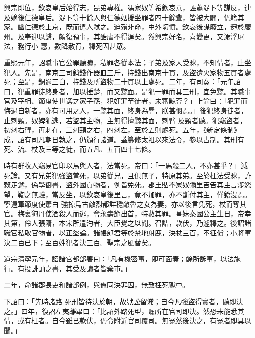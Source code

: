 
\begin{pinyinscope}

 興宗即位，欽哀皇后始得志，昆弟專權。馮家奴等希欽哀意，誣蕭浞卜等謀反，連及嫡後仁德皇后。浞卜等十餘人與仁德姻援坐罪者四十餘輩，皆被大闢，仍籍其家。幽仁德於上京，既而遣人弒之。迫殞非命，中外切憤。欽哀後謀廢立，遷於慶州。及奉迎以歸，頗復預事，其酷虐不得逞矣。然興宗好名，喜變更，又溺浮屠法，務行小
 惠，數降赦宥，釋死囚甚眾。



 重熙元年，詔職事官公罪聽贖，私罪各從本法；子弟及家人受賕，不知情者，止坐犯人。先是，南京三司銷錢作器皿三斤，持錢出南京十貫，及盜遺火家物五貫者處死；至是，銅逾三白，持錢及所盜物二十貫以上處死。二年，有司奏：「元年詔曰，犯重罪徒終身者，加以捶楚，而又黥面。是犯一罪而具三刑，宜免黥。其職事官及宰相、節度使世選之家子孫，犯奸罪至徒者，未審黥否？」上諭曰：「犯罪而悔過自新者，亦有可用之人，一黥其面，終身為辱，朕甚憫焉。」後犯終身徒者，止刺頸。奴婢犯逃，若盜其主物，主無得擅黥其面，刺臂
 及頸者聽。犯竊盜者，初刺右臂，再刺在，三刺頸之右，四刺左，至於五則處死。五年，《新定條制》成，詔有司凡朝日執之，仍頒行諸道。蓋纂修太祖以來法令，參以古制。其刑有死、流、杖及三等之徒，而五凡、五百四十七條。



 時有群牧人竊易官印以馬與人者，法當死，帝曰：「一馬殺二人，不亦甚乎？」減死論。又有兄弟犯強盜當死，以弟從兄，且俱無子，特原其弟。至於枉法受賕，詐敕走遞，偽學御書，盜外國貢物者，例皆免死。郡王貼不家奴彌里吉告其主言涉怨望，鞫之無驗，當反坐，以欽哀皇後里言，竟不加罪，亦不斷付其主，僅籍沒焉。寧遠軍節度使蕭白
 強掠烏古敵烈都詳穩敵魯之女為妻，亦以後言免死，杖而奪其官。梅裏狗丹使酒殺人而逃，會永壽節出首，特赦其罪。皇妹秦國公主生日，帝幸其第，伶人張隋，本宋所遣汋者，大臣覺之以聞。召詰，款伏，乃遽釋之。後詔諸職官私取官物者，以正盜論。諸帳郎君等於禁地射鹿，決杖三百，不征償；小將軍決二百已下；至百姓犯者決三百。聖宗之風替矣。



 道宗清寧元年，詔諸宮都部署曰：「凡有機密事，即可面奏；餘所訴事，以法施行。有投誹訕之書，其受及讀者皆棄市。」



 二年，命諸郡長吏和諸部例，與僚同決罪囚，無致枉死獄中。



 下詔曰：「先時諸路
 死刑皆待決於朝，故獄訟留滯；自今凡強盜得實者，聽即決之。」四年，復詔左夷離畢曰：「比詔外路死型，聽所在官司即決。然恐未能悉其情，或有枉者。自今雖已款伏，仍令附近官司覆司。無冤然後決之，有冤者即具以聞。」




\end{pinyinscope}
